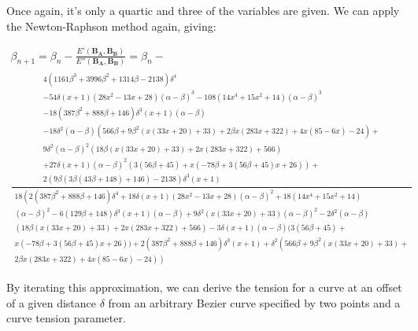 \documentclass[a4paper]{article}
\begin{document}
Once again, it's only a quartic and three of the variables are given. We can apply the Newton-Raphson method again, giving:

\begin{multline}
\beta_{n+1} = \beta_n -\frac{E'(\mathbf{B_A},\mathbf{B_B})}{E''(\mathbf{B_A},\mathbf{B_B})} = \beta_n - \\
\frac{\begin{matrix}4 \left(1161 \beta ^3+3996 \beta ^2+1314 \beta -2138\right) \delta ^4\\
-54 \delta  (x+1) \left(28 x^2-13 x+28\right) (\alpha -\beta )^3-108 \left(14 x^4+15 x^2+14\right) (\alpha -\beta )^3 \\
-18 \left(387 \beta ^2+888 \beta +146\right) \delta ^3 (x+1) (\alpha -\beta ) \\
-18 \delta ^2 (\alpha -\beta ) \left(566 \beta +9 \beta ^2 (x (33 x+20)+33)+2 \beta  x (283 x+322)+4 x (85-6 x)-24\right)+ \\
9 \delta ^2 (\alpha -\beta )^2 (18 \beta  (x (33 x+20)+33)+2 x (283 x+322)+566) \\
+27 \delta  (x+1) (\alpha -\beta )^2 (3 (56 \beta +45)+x (-78 \beta +3 (56 \beta +45) x+26))+ \\
2 (9 \beta  (3 \beta  (43 \beta +148)+146)-2138) \delta ^3 (x+1)\end{matrix}}{\begin{matrix}
18 \left(2 \left(387 \beta ^2+888 \beta +146\right) \delta ^4+18 \delta  (x+1) \left(28 x^2-13 x+28\right) (\alpha -\beta )^2+18 \left(14 x^4+15 x^2+14\right) \right. \\
\left. (\alpha -\beta )^2 -6 (129 \beta +148) \delta ^3 (x+1) (\alpha -\beta )+9 \delta ^2 (x (33 x+20)+33) (\alpha -\beta )^2-2 \delta ^2 (\alpha -\beta ) \right. \\
\left. (18 \beta  (x (33 x+20)+33)+2 x (283 x+322)+566)-3 \delta  (x+1) (\alpha -\beta ) (3 (56 \beta +45)+ \right.\\
\left.x (-78 \beta +3 (56 \beta +45) x+26))+ 2 \left(387 \beta ^2+888 \beta +146\right) \delta ^3 (x+1)+\delta ^2 \left(566 \beta +9 \beta ^2 (x (33 x+20)+33)+ \right. \right. \\
\left. \left. 2 \beta  x (283 x+322)+4 x (85-6 x)-24\right)\right)\end{matrix}}
\end{multline}

By iterating this approximation, we can derive the tension for a curve at an offset of a given distance $\delta$ from an arbitrary Bezier curve specified by two points and a curve tension parameter.
\end{document}

